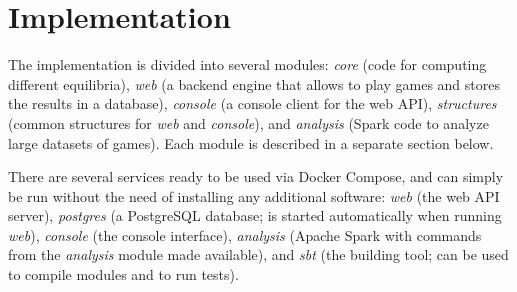 \chapter{Implementation}
The implementation is divided into several modules: \textit{core} (code for computing different equilibria), \textit{web} (a backend engine that allows to play games and stores the results in a database), \textit{console} (a console client for the web API), \textit{structures} (common structures for \textit{web} and \textit{console}), and \textit{analysis} (Spark code to analyze large datasets of games).
Each module is described in a separate section below.

There are several services ready to be used via Docker Compose, and can simply be run without the need of installing any additional software:
\textit{web} (the web API server), \textit{postgres} (a PostgreSQL database; is started automatically when running \textit{web}), \textit{console} (the console interface), \textit{analysis} (Apache Spark with commands from the \textit{analysis} module made available), and \textit{sbt} (the building tool; can be used to compile modules and to run tests).

